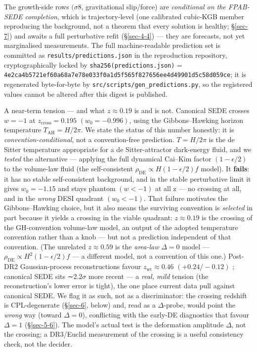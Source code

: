 \documentclass[preprint,12pt]{elsarticle}
\begin{document}
\sloppy

The growth-side rows \((\sigma 8\), gravitational slip/force) are
\emph{conditional on the FPAB-SEDE completion}, which is
trajectory-level (one calibrated cubic-KGB member reproducing the
background, not a theorem that every solution is healthy; §\ref{sec-7})
and awaits a full perturbative refit (§\ref{sec-4-4}) --- they are
forecasts, not yet marginalised measurements. The full machine-readable
prediction set is committed as \texttt{results/\allowbreak predictions.\allowbreak json} in the
reproduction repository, cryptographically locked by
\texttt{sha256(predictions.\allowbreak json)} =
\texttt{4e2ca4b5\allowbreak{}721ef60a\allowbreak{}68a7e78e\allowbreak{}033f0a1d\allowbreak{}5f565f82\allowbreak{}7656ee4d\allowbreak{}49901d5c\allowbreak{}58d059ce};
it is regenerated byte-for-byte by
\texttt{src/\allowbreak scripts/\allowbreak gen\_\allowbreak predictions.\allowbreak py}, so the registered values
cannot be altered after this digest is published.

\fussy

A near-term tension --- and what \(z \approx  0.19\) is and is not.
Canonical SEDE crosses \(w = -1\) at \(z_{\mathrm{cross}} = 0.195\)
\((w_{0} = -0.996)\), using the Gibbons--Hawking horizon temperature
\(T_\mathrm{AH} = H/2\pi\). We state the status of this number honestly:
it is \emph{convention-conditional}, not a convention-free prediction.
\(T = H/2\pi\) is the de Sitter temperature appropriate for a de
Sitter-attractor dark-energy fluid, and we \emph{tested} the alternative
--- applying the full dynamical Cai--Kim factor \((1-\epsilon /2)\) to
the volume-law fluid (the self-consistent
\(\rho _\mathrm{DE} \propto  H(1-\epsilon /2)f\) model). It
\textbf{fails}: it has no stable self-consistent background, and in the
stable perturbative limit it gives \(w_{0} = -1.15\) and stays phantom
\((w < -1)\) at all z --- no crossing at all, and in the \emph{wrong}
DESI quadrant \((w_{0} < -1)\). That failure motivates the
Gibbons--Hawking choice, but it also means the surviving convention is
\emph{selected} in part because it yields a crossing in the viable
quadrant: \(z \approx  0.19\) is the crossing of the GH-convention
volume-law model, an output of the adopted temperature convention rather
than a knob --- but not a prediction independent of that convention.
(The unrelated \(z \approx  0.59\) is the \emph{area-law}
\(\Delta  = 0\) model ---
\(\rho _\mathrm{DE} \propto  H^{2}(1-\epsilon /2)f\) --- a different
model, not a convention of this one.) Post-DR2 Gaussian-process
reconstructions favour \(z_{\mathrm{wt}} \approx  0.46\)
\((+0.24/-0.12)\) \citep{Zhang:2025bmk, You:2025uon}; canonical SEDE
sits ∼\(2.2\sigma\) more recent --- a \emph{real, mild} tension (the
reconstruction's lower error is tight), the one place current data pull
against canonical SEDE. We flag it as such, not as a discriminator: the
crossing redshift is CPL-degenerate (§\ref{sec-6}, below) and, read as a
\(\Delta\)-probe, would point the \emph{wrong} way (toward
\(\Delta  = 0\)), conflicting with the early-DE diagnostics that favour
\(\Delta  = 1\) (§\ref{sec-5-6}). The model's actual test is the
deformation amplitude \(\Delta\), not the crossing; a DR3/Euclid
measurement of the crossing is a useful consistency check, not the
decider.
\end{document}
